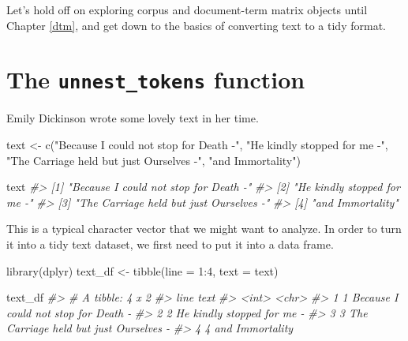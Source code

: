 \documentclass[
]{book}
\newenvironment{Shaded}{\begin{snugshade}}{\end{snugshade}}
\newcommand{\AttributeTok}[1]{\textcolor[rgb]{0.77,0.63,0.00}{#1}}
\newcommand{\CommentTok}[1]{\textcolor[rgb]{0.56,0.35,0.01}{\textit{#1}}}
\newcommand{\DecValTok}[1]{\textcolor[rgb]{0.00,0.00,0.81}{#1}}
\newcommand{\FunctionTok}[1]{\textcolor[rgb]{0.00,0.00,0.00}{#1}}
\newcommand{\NormalTok}[1]{#1}
\newcommand{\OtherTok}[1]{\textcolor[rgb]{0.56,0.35,0.01}{#1}}
\newcommand{\SpecialCharTok}[1]{\textcolor[rgb]{0.00,0.00,0.00}{#1}}
\newcommand{\StringTok}[1]{\textcolor[rgb]{0.31,0.60,0.02}{#1}}
\begin{document}
Let's hold off on exploring corpus and document-term matrix objects until Chapter \ref{dtm}, and get down to the basics of converting text to a tidy format.

\hypertarget{the-unnest_tokens-function}{%
\section{\texorpdfstring{The \texttt{unnest\_tokens} function}{The unnest\_tokens function}}\label{the-unnest_tokens-function}}

Emily Dickinson wrote some lovely text in her time.

\begin{Shaded}
\begin{Highlighting}[]
\NormalTok{text }\OtherTok{\textless{}{-}} \FunctionTok{c}\NormalTok{(}\StringTok{"Because I could not stop for Death {-}"}\NormalTok{,}
          \StringTok{"He kindly stopped for me {-}"}\NormalTok{,}
          \StringTok{"The Carriage held but just Ourselves {-}"}\NormalTok{,}
          \StringTok{"and Immortality"}\NormalTok{)}

\NormalTok{text}
\CommentTok{\#\textgreater{} [1] "Because I could not stop for Death {-}"  }
\CommentTok{\#\textgreater{} [2] "He kindly stopped for me {-}"            }
\CommentTok{\#\textgreater{} [3] "The Carriage held but just Ourselves {-}"}
\CommentTok{\#\textgreater{} [4] "and Immortality"}
\end{Highlighting}
\end{Shaded}

This is a typical character vector that we might want to analyze. In order to turn it into a tidy text dataset, we first need to put it into a data frame.

\begin{Shaded}
\begin{Highlighting}[]
\FunctionTok{library}\NormalTok{(dplyr)}
\NormalTok{text\_df }\OtherTok{\textless{}{-}} \FunctionTok{tibble}\NormalTok{(}\AttributeTok{line =} \DecValTok{1}\SpecialCharTok{:}\DecValTok{4}\NormalTok{, }\AttributeTok{text =}\NormalTok{ text)}

\NormalTok{text\_df}
\CommentTok{\#\textgreater{} \# A tibble: 4 x 2}
\CommentTok{\#\textgreater{}    line text                                  }
\CommentTok{\#\textgreater{}   \textless{}int\textgreater{} \textless{}chr\textgreater{}                                 }
\CommentTok{\#\textgreater{} 1     1 Because I could not stop for Death {-}  }
\CommentTok{\#\textgreater{} 2     2 He kindly stopped for me {-}            }
\CommentTok{\#\textgreater{} 3     3 The Carriage held but just Ourselves {-}}
\CommentTok{\#\textgreater{} 4     4 and Immortality}
\end{Highlighting}
\end{Shaded}
\end{document}
